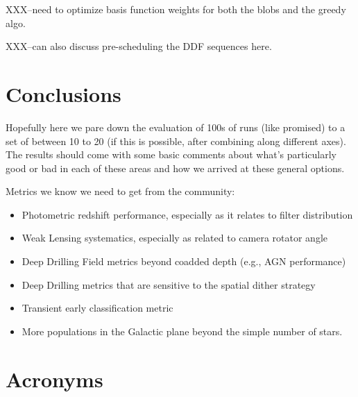 XXX--need to optimize basis function weights for both the blobs and the greedy algo.

XXX--can also discuss pre-scheduling the DDF sequences here.

\section{Conclusions}
Hopefully here we pare down the evaluation of 100s of runs (like promised) to a set of between 10 to 20 (if this is possible, after combining along different axes). 
The results should come with some basic comments about what's particularly good or bad in each of these areas and how we arrived at these general options. 

Metrics we know we need to get from the community:
\begin{itemize}
    \item{Photometric redshift performance, especially as it relates to filter distribution}
    \item{Weak Lensing systematics, especially as related to camera rotator angle}
    \item{Deep Drilling Field metrics beyond coadded depth (e.g., AGN performance)}
    \item{Deep Drilling metrics that are sensitive to the spatial dither strategy}
    \item{Transient early classification metric}
    \item{More populations in the Galactic plane beyond the simple number of stars.}
\end{itemize}




\section{Acronyms} \label{sec:acronyms}

